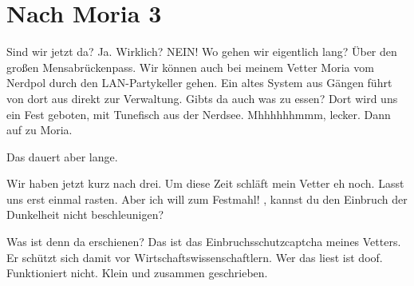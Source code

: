 \newpage
\section{Nach Moria 3}
\label{sec:nach-moria3}
\charaktere{\Frodo, \Sum, \Gimli, \Legolars, \Gandalf}
\sound{-}

\begin{verseplay}[7em]
\s{\Sum} Sind wir jetzt da?
\s{\Gandalf} Ja.
\s{\Sum}  Wirklich?
 NEIN!
\s{\Legolars} Wo gehen wir eigentlich lang?
\s{\Gandalf} Über den großen Mensabrückenpass.
\s{\Gimli} Wir können auch bei meinem Vetter Moria vom Nerdpol durch den LAN-Partykeller gehen. Ein altes System aus Gängen führt von dort aus direkt zur Verwaltung.
\s{\Sum} Gibts da auch was zu essen?
\s{\Gimli} Dort wird uns ein Fest geboten, mit Tunefisch aus der Nerdsee.
\s{\Sum} Mhhhhhhmmm, lecker.
\s{\Gandalf} Dann auf zu Moria.
\end{verseplay}


\begin{verseplay}[7em]
\s{\Sum} Das dauert aber lange.
\end{verseplay}


\begin{verseplay}[7em]
\s{\Gimli} Wir haben jetzt kurz nach drei. Um diese Zeit schläft mein Vetter eh noch. Lasst uns erst einmal rasten.
\s{\Sum} Aber ich will zum Festmahl!
\s{\Legolars} \Gandalf, kannst du den Einbruch der Dunkelheit nicht beschleunigen?
\end{verseplay}

\begin{verseplay}[7em]
\s{\Frodo} Was ist denn da erschienen?
\s{\Gimli} Das ist das Einbruchsschutzcaptcha meines Vetters. Er schützt sich damit vor Wirtschaftswissenschaftlern.
\s{\Gandalf}  Wer das liest ist doof.
\s{\Legolars}  Funktioniert nicht.
\s{\Gandalf} Klein und zusammen geschrieben.

\end{verseplay}

